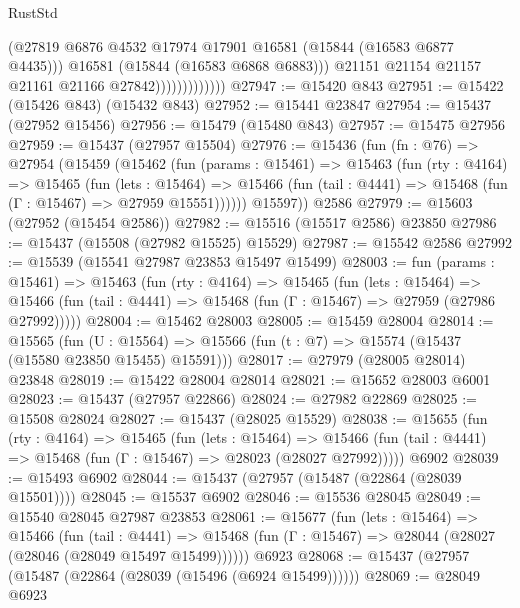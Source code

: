 \begin{lexlean}{RustStd}
\begin{coremodule}
                                (@27819
                                  @6876
                                  @4532
                                  @17974
                                  @17901
                                  @16581
                                  (@15844 (@16583 @6877 @4435)))
                                @16581
                                (@15844 (@16583 @6868 @6883)))
                              @21151
                              @21154
                              @21157
                              @21161
                              @21166
                              @27842)))))))))))))
@27947 := @15420 @843
@27951 := @15422 (@15426 @843) (@15432 @843)
@27952 := @15441 @23847
@27954 := @15437 (@27952 @15456)
@27956 := @15479 (@15480 @843)
@27957 := @15475 @27956
@27959 := @15437 (@27957 @15504)
@27976 := @15436
    (fun (fn : @76) =>
    @27954
      (@15459
        (@15462
          (fun (params : @15461) =>
          @15463
            (fun (rty : @4164) =>
            @15465
              (fun (lets : @15464) =>
              @15466 (fun (tail : @4441) => @15468 (fun (Γ : @15467) => @27959 @15551))))))
        @15597))
    @2586
@27979 := @15603 (@27952 (@15454 @2586))
@27982 := @15516 (@15517 @2586) @23850
@27986 := @15437 (@15508 (@27982 @15525) @15529)
@27987 := @15542 @2586
@27992 := @15539 (@15541 @27987 @23853 @15497 @15499)
@28003 := fun (params : @15461) =>
  @15463
    (fun (rty : @4164) =>
    @15465
      (fun (lets : @15464) =>
      @15466 (fun (tail : @4441) => @15468 (fun (Γ : @15467) => @27959 (@27986 @27992)))))
@28004 := @15462 @28003
@28005 := @15459 @28004
@28014 := @15565
    (fun (U : @15564) => @15566 (fun (t : @7) => @15574 (@15437 (@15580 @23850 @15455) @15591)))
@28017 := @27979 (@28005 @28014) @23848
@28019 := @15422 @28004 @28014
@28021 := @15652 @28003 @6001
@28023 := @15437 (@27957 @22866)
@28024 := @27982 @22869
@28025 := @15508 @28024
@28027 := @15437 (@28025 @15529)
@28038 := @15655
    (fun (rty : @4164) =>
    @15465
      (fun (lets : @15464) =>
      @15466 (fun (tail : @4441) => @15468 (fun (Γ : @15467) => @28023 (@28027 @27992)))))
    @6902
@28039 := @15493 @6902
@28044 := @15437 (@27957 (@15487 (@22864 (@28039 @15501))))
@28045 := @15537 @6902
@28046 := @15536 @28045
@28049 := @15540 @28045 @27987 @23853
@28061 := @15677
    (fun (lets : @15464) =>
    @15466
      (fun (tail : @4441) =>
      @15468 (fun (Γ : @15467) => @28044 (@28027 (@28046 (@28049 @15497 @15499))))))
    @6923
@28068 := @15437 (@27957 (@15487 (@22864 (@28039 (@15496 (@6924 @15499))))))
@28069 := @28049 @6923

\end{coremodule}
\end{lexlean}
